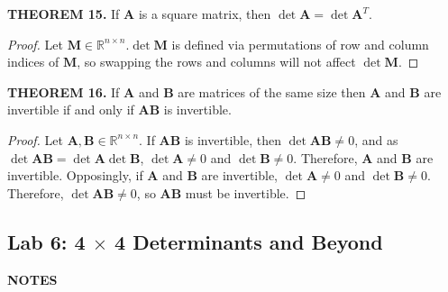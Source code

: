 \documentclass[12pt]{article}
\newcommand{\mat}[1]{\mathbf{#1}}
\newcommand{\theorem}[2]{\textbf{THEOREM #1.} #2}
\newcommand{\notes}{\textbf{NOTES}}
\begin{document}
\theorem{15}{If $\mat{A}$ is a square matrix, then $\det \mat{A} = \det \mat{A}^{T}.$}

\begin{proof}
Let $\mat{M} \in \mathbb{R}^{n \times n}. \det \mat{M}$ is defined via permutations of row and column indices of $\mat{M}$, so swapping the rows and columns will not affect $\det \mat{M}$.
\end{proof}

\theorem{16}{If $\mat{A}$ and $\mat{B}$ are matrices of the same size then $\mat{A}$ and $\mat{B}$ are invertible if and only if $\mat{AB}$ is invertible.}

\begin{proof}
Let $\mat{A}, \mat{B} \in \mathbb{R}^{n \times n}$. If $\mat{AB}$ is invertible, then $\det \mat{AB} \neq 0$, and as $\det \mat{AB} = \det \mat{A} \det \mat{B}$, $\det \mat{A} \neq 0$ and $\det \mat{B} \neq 0$. Therefore, $\mat{A}$ and $\mat{B}$ are invertible. Opposingly, if $\mat{A}$ and $\mat{B}$ are invertible, $\det \mat{A} \ne 0$ and $\det \mat{B} \ne 0$. Therefore, $\det \mat{AB} \ne 0$, so $\mat{AB}$ must be invertible.
\end{proof}

\subsection{Lab 6: 4 $\times$ 4 Determinants and Beyond}

\notes
\end{document}
